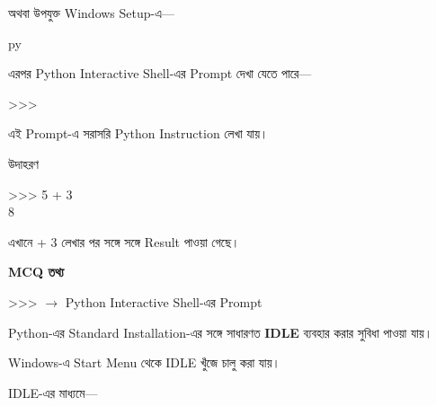অথবা উপযুক্ত Windows Setup-এ—

\begin{codebox}

\begin{english}
\ttfamily
py
\end{english}

\end{codebox}

এরপর Python Interactive Shell-এর Prompt দেখা যেতে পারে—

\begin{codebox}

\begin{english}
\ttfamily
>>>
\end{english}

\end{codebox}

এই Prompt-এ সরাসরি Python Instruction লেখা যায়।

\begin{examplebox}{উদাহরণ}

\begin{codebox}

\begin{english}
\ttfamily
>>> 5 + 3\\
8
\end{english}

\end{codebox}

এখানে
\textenglish{ + 3}
লেখার পর সঙ্গে সঙ্গে
\textenglish{}
Result পাওয়া গেছে।

\end{examplebox}

\begin{rememberbox}

\textbf{\color{deepOrange}MCQ তথ্য}

\textenglish{\ttfamily >>>}
\(\longrightarrow\)
Python Interactive Shell-এর Prompt

\end{rememberbox}



Python-এর Standard Installation-এর সঙ্গে সাধারণত
\textbf{IDLE} ব্যবহার করার সুবিধা পাওয়া যায়।

Windows-এ Start Menu থেকে IDLE খুঁজে চালু করা যায়।

IDLE-এর মাধ্যমে—

